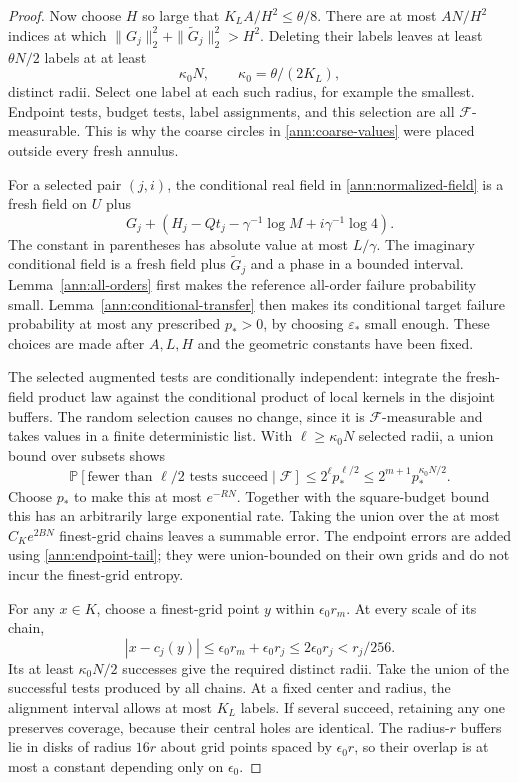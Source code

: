 \documentclass[11pt]{article}
\numberwithin{equation}{section}
\theoremstyle{definition}
\theoremstyle{remark}
\newcommand{\PP}{\mathbb P}
\newcommand{\1}{\mathbf 1}
\begin{document}
\begin{proof}
Now choose \(H\) so large that
\(K_LA/H^2\le\theta/8\).
There are at most \(AN/H^2\) indices at which
\(\|G_j\|_2^2+\|\widetilde G_j\|_2^2>H^2\).
Deleting their labels leaves at least \(\theta N/2\) labels
at at least
\[
 \kappa_0N,\qquad \kappa_0=\theta/(2K_L),
\]
distinct radii.  Select one label at each such radius, for example
the smallest.  Endpoint tests, budget tests, label assignments, and
this selection are all \(\mathcal F\)-measurable.  This is why
the coarse circles in \eqref{ann:coarse-values} were placed outside
every fresh annulus.

For a selected pair \((j,i)\), the conditional real field in
\eqref{ann:normalized-field} is a fresh field on \(U\) plus
\[
 G_j+\left(H_j-Qt_j-\gamma^{-1}\log M
                                  +i\gamma^{-1}\log4\right).
\]
The constant in parentheses has absolute value at most \(L/\gamma\).
The imaginary conditional field is a fresh field plus
\(\widetilde G_j\) and a phase in a bounded interval.
Lemma~\ref{ann:all-orders} first makes the reference all-order
failure probability small.  Lemma~\ref{ann:conditional-transfer}
then makes its conditional target failure probability at most any
prescribed \(p_*>0\), by choosing \(\varepsilon_*\) small enough.
These choices are made after
\(A,L,H\) and the geometric constants have been fixed.

The selected augmented tests are conditionally independent:
integrate the fresh-field product law against the conditional
product of local kernels in the disjoint buffers.  The random
selection causes no change, since it is \(\mathcal F\)-measurable
and takes values in a finite deterministic list.
With \(\ell\ge\kappa_0N\) selected radii, a union bound over
subsets shows
\begin{equation}
 \PP[\text{fewer than }\ell/2\text{ tests succeed}\mid\mathcal F]
 \le 2^\ell p_*^{\ell/2}
 \le 2^{m+1}p_*^{\kappa_0N/2}.
 \label{ann:bernoulli-tail}
\end{equation}
Choose \(p_*\) to make this at most \(e^{-RN}\).
Together with the square-budget bound this has an arbitrarily
large exponential rate.  Taking the union over the at most
\(C_Ke^{2BN}\) finest-grid chains leaves a summable error.
The endpoint errors are added using \eqref{ann:endpoint-tail};
they were union-bounded on their own grids and do not incur the
finest-grid entropy.

For any \(x\in K\), choose a finest-grid point \(y\) within
\(\epsilon_0r_m\).  At every scale of its chain,
\[
 |x-c_j(y)|\le\epsilon_0r_m+\epsilon_0r_j
                  \le 2\epsilon_0r_j<r_j/256.
\]
Its at least \(\kappa_0N/2\) successes give the required distinct
radii.  Take the union of the successful tests produced by all
chains.  At a fixed center and radius, the alignment interval
allows at most \(K_L\) labels.  If several succeed, retaining any
one preserves coverage, because their central holes are identical.
The radius-\(r\) buffers lie in disks of radius \(16r\) about
grid points spaced by \(\epsilon_0r\), so their overlap is at
most a constant depending only on \(\epsilon_0\).


\end{proof}
\end{document}

